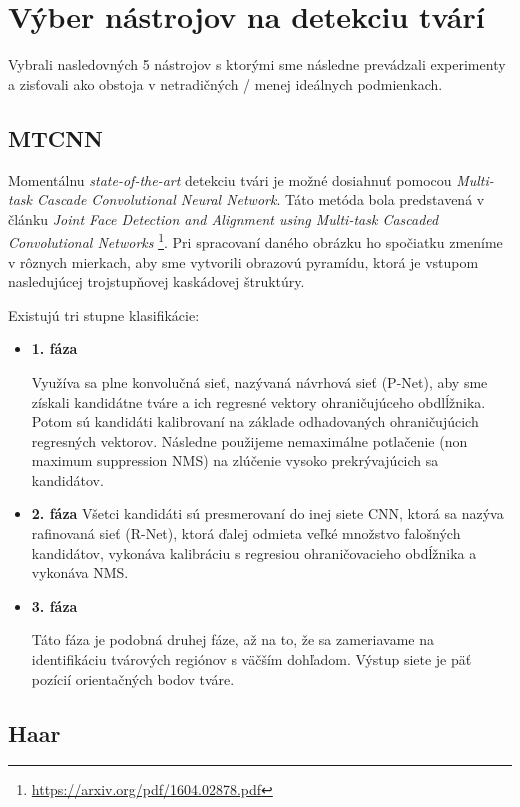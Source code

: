 \documentclass[]{article}
\begin{document}
	\section{Výber nástrojov na detekciu tvárí}
	
	Vybrali nasledovných 5 nástrojov s ktorými sme následne prevádzali experimenty a zisťovali ako obstoja v netradičných / menej ideálnych podmienkach.
	
	\subsection*{MTCNN}
	Momentálnu \textit{state-of-the-art} detekciu tvári je možné dosiahnuť pomocou \textit{Multi-task Cascade Convolutional Neural Network}. Táto metóda bola predstavená v článku \textit{Joint Face Detection and Alignment using Multi-task Cascaded Convolutional Networks} \footnote{\url{https://arxiv.org/pdf/1604.02878.pdf}}. Pri spracovaní daného obrázku ho spočiatku zmeníme v rôznych mierkach, aby sme vytvorili obrazovú pyramídu, ktorá je vstupom nasledujúcej trojstupňovej kaskádovej štruktúry. 
	
	Existujú tri stupne klasifikácie:
	
	\begin{itemize}
		\item \textbf{1. fáza}
		
		Využíva sa plne konvolučná sieť, nazývaná návrhová sieť (P-Net), aby sme získali kandidátne tváre a ich regresné vektory ohraničujúceho obdlĺžnika. Potom sú kandidáti kalibrovaní na základe odhadovaných ohraničujúcich regresných vektorov. Následne použijeme nemaximálne potlačenie (non maximum suppression NMS) na zlúčenie vysoko prekrývajúcich sa kandidátov.
		
		\item \textbf{2. fáza}
		Všetci kandidáti sú presmerovaní do inej siete CNN, ktorá sa nazýva rafinovaná sieť (R-Net), ktorá ďalej odmieta veľké množstvo falošných kandidátov, vykonáva kalibráciu s regresiou ohraničovacieho obdĺžnika a vykonáva NMS.
		
		\item \textbf{3. fáza}
		
		Táto fáza je podobná druhej fáze, až na to, že sa zameriavame na identifikáciu tvárových regiónov s väčším dohľadom. Výstup siete je päť pozícií orientačných bodov tváre.
	\end{itemize}

	\subsection*{Haar}
	
\end{document}
